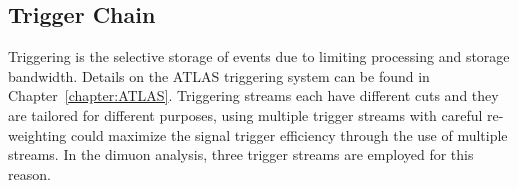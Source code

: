 




\subsection{Trigger Chain}
\label{section:trigger}
Triggering is the selective storage of events due to limiting processing and storage bandwidth. Details on the ATLAS triggering system can be found in Chapter~\ref{chapter:ATLAS}.
Triggering streams each have different cuts and they are tailored for different purposes, using multiple trigger streams with careful re-weighting could maximize the signal trigger efficiency through the use of multiple streams. In the dimuon analysis, three trigger streams are employed for this reason.

